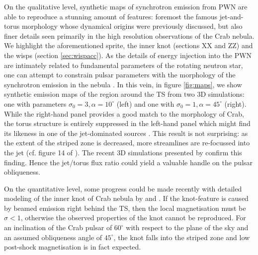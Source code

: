 On the qualitative level, synthetic maps of synchrotron emission from PWN are able to reproduce a stunning amount of features: foremost the famous jet-and-torus morphology whose dynamical origins were previously discussed, but also finer details seen primarily in the high resolution observations of the Crab nebula.  We highlight the aforementioned sprite, the inner knot {\cred (sections XX and ZZ)} and the wisps (section \ref{sec:wispacc}).
As the details of energy injection into the PWN are intimately related to fundamental parameters of the rotating neutron star, one can attempt to constrain pulsar parameters with the morphology of the synchrotron emission in the nebula \citep[e.g.][]{BuhlerGiomi2016}.  
In this vein, in figure \ref{fig:maps}, we show synthetic emission maps of the region around the TS from two 3D simulations: one with parameters $\sigma_0=3,\alpha=10^\circ$ (left) and one with $\sigma_0=1,\alpha=45^\circ$ (right).  While the right-hand panel provides a good match to the morphology of Crab, the torus structure is entirely suppressed in the left-hand panel which might find its likeness in one of the jet-dominated sources \citep[][]{KargaltsevPavlov2008}.  This result is not surprising: as the extent of the striped zone is decreased, more streamlines are re-focussed into the jet (cf. figure 14 of \cite{PorthKomissarov2014a}).  The recent 3D simulations presented by \cite{Olmi2016} confirm this finding.  Hence the jet/torus flux ratio could yield a valuable handle on the pulsar obliqueness.  

On the quantitative level, some progress could be made recently with detailed modeling of the inner knot of Crab nebula by \cite{YuanBlandford2015} and \cite{LyutikovKomissarov2016}.  If the knot-feature is caused by beamed emission right behind the TS, then the local magnetisation must be $\sigma<1$, otherwise the observed properties of the knot cannot be reproduced.  For an inclination of the Crab pulsar of $60^\circ$ with respect to the plane of the sky and an assumed obliqueness angle of $45^\circ$, the knot falls into the striped zone and low post-shock magnetisation is in fact expected.  


